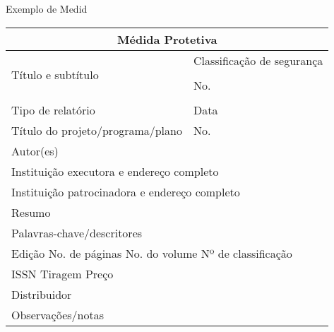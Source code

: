 \documentclass[
	12pt,				%
    oneside,			%
	a4paper,			%
	chapter=TITLE,		%
	english,			%
	french,				%
	spanish,			%
	brazil,				%
	]{abntex2}
\begin{document}
Exemplo de Medid

\bigskip

\begin{tabular}{|p{9cm}|p{5cm}|} %
\hline
\multicolumn{2}{|c|}{\textbf{\large Médida Protetiva}}\\
\hline
\multirow{4}{10cm}[24pt]{Título e subtítulo}& Classificação de segurança\\
                   & \\
                   \cline{2-2}
                   & No.\\
                   & \\
				
\hline
Tipo de relatório & Data\\
\hline
Título do projeto/programa/plano & No.\\
\hline
\multicolumn{2}{|l|}{Autor(es)} \\
\hline
\multicolumn{2}{|l|}{Instituição executora e endereço completo} \\
\hline
\multicolumn{2}{|l|}{Instituição patrocinadora e endereço completo} \\
\hline
\multicolumn{2}{|l|}{Resumo}\\[3cm]
\hline
\multicolumn{2}{|l|}{Palavras-chave/descritores}\\
\hline
\multicolumn{2}{|l|}{
Edição \hfill No. de páginas \hfill No. do volume \hfill Nº de classificação \phantom{XXXX}} \\
\hline
\multicolumn{2}{|l|}{
ISSN \hfill \hfill Tiragem \hfill Preço \phantom{XXXXXXXX}} \\
\hline
\multicolumn{2}{|l|}{Distribuidor} \\
\hline
\multicolumn{2}{|l|}{Observações/notas}\\[3cm]
\hline
\end{tabular}
\end{document}
